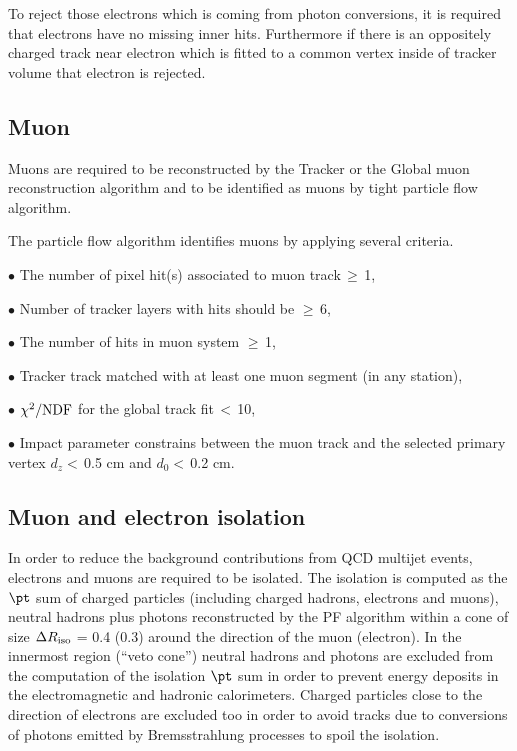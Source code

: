 To reject those electrons which is coming from photon conversions, it is required that electrons have no missing inner hits. Furthermore if there is an oppositely charged track near electron which is fitted to a common vertex inside of tracker volume that electron is rejected.  
\subsection{Muon}
Muons are required to be reconstructed by the Tracker or the Global muon reconstruction algorithm and to be identified as 
muons by tight particle flow algorithm.

The particle flow algorithm identifies muons by applying several criteria.

$\bullet$ The number of pixel hit(s) associated to muon track\,$\geq $\,1,

$\bullet$ Number of tracker layers with hits should be $\geq $\,6,

$\bullet$ The number of hits in muon system $\geq $\,1,

$\bullet$ Tracker track matched with at least one muon segment (in any station),

$\bullet$ $\chi ^{2}/{\rm NDF} $ for the global track fit\,$< $\,10,

$\bullet$ Impact parameter constrains between the muon track and the selected primary vertex 
 $d_{z} < $\,0.5 cm and $d_{0} <$\,0.2 cm.

\subsection{Muon and electron isolation}

In order to reduce the background contributions from QCD multijet events, electrons and
muons are required to be isolated. The isolation is computed as the $\pt$ sum of charged particles (including charged hadrons, 
electrons and muons), neutral hadrons plus photons reconstructed by the PF algorithm within a cone of size
$\Delta R_{\rm iso}$ = 0.4 (0.3) around the direction of the muon (electron). 
In the innermost region
(``veto cone'') neutral
hadrons and photons  are excluded from the computation of the isolation $\pt$ sum in order to prevent energy deposits in the electromagnetic and hadronic calorimeters. Charged particles close to the direction of electrons  are excluded too in order to avoid tracks due to conversions of photons emitted by Bremsstrahlung processes to spoil the isolation.

